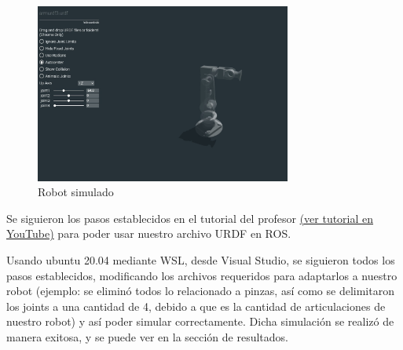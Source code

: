 \begin{figure}[H]
	\centering
	\includegraphics[width=0.75\textwidth]{img/robotsimulado}
	\caption{Robot simulado}
	\label{fig:Robot simulado}
\end{figure}

Se siguieron los pasos establecidos en el tutorial del profesor 
\href{https://www.youtube.com/watch?v=p9g-5OLhynA&list=PLeEzO_sX5H6TBD6EMGgV-qdhzxPY19m12&index=1&ab_channel=AgeofRobotics}{(ver tutorial en YouTube)} 
para poder usar nuestro archivo URDF en ROS.

Usando ubuntu 20.04 mediante WSL, desde Visual Studio, se siguieron todos los pasos establecidos, modificando los archivos requeridos para adaptarlos a nuestro robot (ejemplo: se eliminó todos lo relacionado a pinzas, así como se delimitaron los joints a una cantidad de 4, debido a que es la cantidad de articulaciones de nuestro robot) y así poder simular correctamente. Dicha simulación se realizó de manera exitosa, y se puede ver en la sección de resultados.

